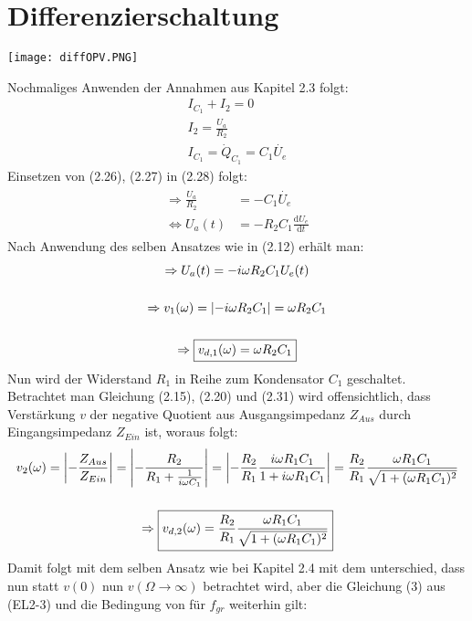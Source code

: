 \section{Differenzierschaltung}
\label{sec:diffschaltung}
\begin{center}
    \texttt{[image: diffOPV.PNG]}
\end{center}
Nochmaliges Anwenden der Annahmen aus Kapitel 2.3 folgt:
\begin{gather}
    I_{C_1} + I_2 = 0\\
    I_2 = \frac{U_a}{R_2}\\
    I_{C_1} = \dot{Q}_{C_1} = C_1 \dot{U_e}
\end{gather}
Einsetzen von (2.26), (2.27) in (2.28) folgt: 
\begin{gather}
    \begin{aligned}
        \Rightarrow \frac{U_a}{R_2}&= -C_1\dot{U_e}\\
        \Leftrightarrow U_a(t)&=-R_2C_1\frac{\text{d}U_e}{\text{d}t}
    \end{aligned}
\end{gather}
Nach Anwendung des selben Ansatzes wie in (2.12) erhält man:
\begin{gather}
    \Rightarrow U_a(t)=-i\omega R_2 C_1 U_e(t)\\[0.5cm]
    \Rightarrow v_1(\omega)=\abs{-i\omega R_2 C_1}=\omega R_2 C_1\\[0.5cm]
    \Rightarrow \boxed{v_{d,1}(\omega) = \omega R_2 C_1}
\end{gather}
Nun wird der Widerstand $R_1$ in Reihe zum Kondensator $C_1$ geschaltet. Betrachtet man Gleichung (2.15), (2.20) und (2.31) wird offensichtlich, dass Verstärkung $v$ der negative Quotient aus Ausgangsimpedanz $Z_{Aus}$ durch Eingangsimpedanz $Z_{Ein}$ ist, woraus folgt: 
\begin{gather}
    v_2(\omega) = \abs{-\frac{Z_{Aus}}{Z_{Ein}}} = \abs{-\frac{R_2}{R_1 + \frac{1}{i\omega C_1}}} = \abs{-\frac{R_2}{R_1} \frac{i\omega R_1C_1}{1+i\omega R_1C_1}} = \frac{R_2}{R_1} \frac{\omega R_1C_1}{\sqrt{1 + (\omega R_1C_1)^2}}\\[0.5cm]
    \Rightarrow \boxed{v_{d,2}(\omega)=\frac{R_2}{R_1} \frac{\omega R_1C_1}{\sqrt{1 + (\omega R_1C_1)^2}}}
\end{gather}
Damit folgt mit dem selben Ansatz wie bei Kapitel 2.4 mit dem unterschied, dass nun statt $v(0)$ nun $v(\Omega\rightarrow \infty)$ betrachtet wird, aber die Gleichung (3) aus (EL2-3) und die Bedingung von für $f_{gr}$ weiterhin gilt:
